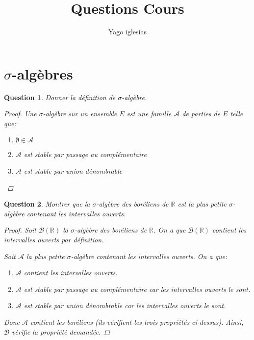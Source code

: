 \documentclass{article}
\theoremstyle{plain}
\newtheorem{question}{Question}
\begin{document}

\title{Questions Cours}
\author{Yago iglesias}
\maketitle
\tableofcontents


\section{$\sigma$-algèbres}

\begin{question}
	Donner la définition de $\sigma$-algèbre.
	\begin{proof}
		Une $\sigma$-algèbre sur un ensemble $E$ est une famille $\mathscr{A}$ de parties de $E$ telle que:
		\begin{enumerate}
			\item $\emptyset \in \mathscr{A}$
			\item $\mathscr{A}$ est stable par passage au complémentaire
			\item $\mathscr{A}$ est stable par union dénombrable
		\end{enumerate}
	\end{proof}
\end{question}

\begin{question}
	Montrer que la $\sigma$-algèbre des boréliens de $\mathbb{R}$ est la plus petite $\sigma$-algèbre contenant les intervalles ouverts.

	\begin{proof}
		Soit $\mathscr{B} (\mathbb{R})$ la $\sigma$-algèbre des boréliens de $\mathbb{R}$. On a que
		$\mathscr{B} (\mathbb{R})$ contient les intervalles ouverts par définition.

		Soit $\mathscr{A}$ la plus petite $\sigma$-algèbre contenant les intervalles ouverts. On a que:
		\begin{enumerate}
			\item $\mathscr{A}$ contient les intervalles ouverts.
			\item $\mathscr{A}$ est stable par passage au complémentaire car les intervalles ouverts le sont.
			\item $\mathscr{A}$ est stable par union dénombrable car les intervalles ouverts le sont.
		\end{enumerate}
		Donc $\mathscr{A}$ contient les boréliens (ils vérifient les trois propriétés ci-dessus).
		Ainsi, $\mathscr{B}$ vérifie la propriété demandée.
	\end{proof}
\end{question}
\end{document}
